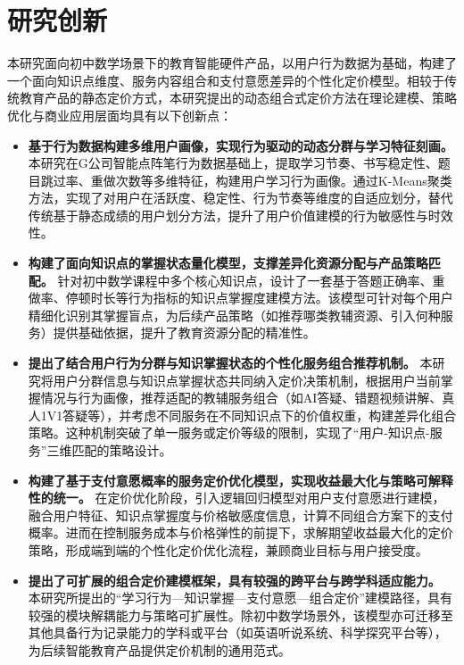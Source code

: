 \section{研究创新}

本研究面向初中数学场景下的教育智能硬件产品，以用户行为数据为基础，构建了一个面向知识点维度、服务内容组合和支付意愿差异的个性化定价模型。相较于传统教育产品的静态定价方式，本研究提出的动态组合式定价方法在理论建模、策略优化与商业应用层面均具有以下创新点：

\begin{itemize}
  \item \textbf{基于行为数据构建多维用户画像，实现行为驱动的动态分群与学习特征刻画。}  
  本研究在G公司智能点阵笔行为数据基础上，提取学习节奏、书写稳定性、题目跳过率、重做次数等多维特征，构建用户学习行为画像。通过K-Means聚类方法，实现了对用户在活跃度、稳定性、行为节奏等维度的自适应划分，替代传统基于静态成绩的用户划分方法，提升了用户价值建模的行为敏感性与时效性。

  \item \textbf{构建了面向知识点的掌握状态量化模型，支撑差异化资源分配与产品策略匹配。}  
  针对初中数学课程中多个核心知识点，设计了一套基于答题正确率、重做率、停顿时长等行为指标的知识点掌握度建模方法。该模型可针对每个用户精细化识别其掌握盲点，为后续产品策略（如推荐哪类教辅资源、引入何种服务）提供基础依据，提升了教育资源分配的精准性。

  \item \textbf{提出了结合用户行为分群与知识掌握状态的个性化服务组合推荐机制。}  
  本研究将用户分群信息与知识点掌握状态共同纳入定价决策机制，根据用户当前掌握情况与行为画像，推荐适配的教辅服务组合（如AI答疑、错题视频讲解、真人1V1答疑等），并考虑不同服务在不同知识点下的价值权重，构建差异化组合策略。这种机制突破了单一服务或定价等级的限制，实现了“用户-知识点-服务”三维匹配的策略设计。

  \item \textbf{构建了基于支付意愿概率的服务定价优化模型，实现收益最大化与策略可解释性的统一。}  
  在定价优化阶段，引入逻辑回归模型对用户支付意愿进行建模，融合用户特征、知识点掌握度与价格敏感度信息，计算不同组合方案下的支付概率。进而在控制服务成本与价格弹性的前提下，求解期望收益最大化的定价策略，形成端到端的个性化定价优化流程，兼顾商业目标与用户接受度。

  \item \textbf{提出了可扩展的组合定价建模框架，具有较强的跨平台与跨学科适应能力。}  
  本研究所提出的“学习行为—知识掌握—支付意愿—组合定价”建模路径，具有较强的模块解耦能力与策略可扩展性。除初中数学场景外，该模型亦可迁移至其他具备行为记录能力的学科或平台（如英语听说系统、科学探究平台等），为后续智能教育产品提供定价机制的通用范式。
\end{itemize}

